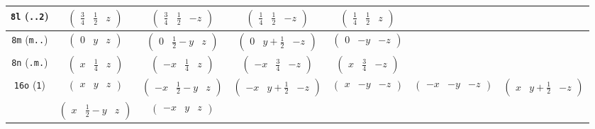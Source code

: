 \documentclass[fleqn,9pt,landscape]{jsarticle}
\begin{document}
\begin{center}
\begin{longtable}{ccccccc}
{\tt 8l} ({\tt ..2}) & $ \begin{pmatrix} \frac{3}{4} & \frac{1}{2} & z \end{pmatrix} $ & $ \begin{pmatrix} \frac{3}{4} & \frac{1}{2} & - z \end{pmatrix} $ & $ \begin{pmatrix} \frac{1}{4} & \frac{1}{2} & - z \end{pmatrix} $ & $ \begin{pmatrix} \frac{1}{4} & \frac{1}{2} & z \end{pmatrix} $ & $  $ & $  $ \\ \hline
{\tt 8m} ({\tt m..}) & $ \begin{pmatrix} 0 & y & z \end{pmatrix} $ & $ \begin{pmatrix} 0 & \frac{1}{2} - y & z \end{pmatrix} $ & $ \begin{pmatrix} 0 & y + \frac{1}{2} & - z \end{pmatrix} $ & $ \begin{pmatrix} 0 & - y & - z \end{pmatrix} $ & $  $ & $  $ \\ \hline
{\tt 8n} ({\tt .m.}) & $ \begin{pmatrix} x & \frac{1}{4} & z \end{pmatrix} $ & $ \begin{pmatrix} - x & \frac{1}{4} & z \end{pmatrix} $ & $ \begin{pmatrix} - x & \frac{3}{4} & - z \end{pmatrix} $ & $ \begin{pmatrix} x & \frac{3}{4} & - z \end{pmatrix} $ & $  $ & $  $ \\ \hline
{\tt 16o} ({\tt 1}) & $ \begin{pmatrix} x & y & z \end{pmatrix} $ & $ \begin{pmatrix} - x & \frac{1}{2} - y & z \end{pmatrix} $ & $ \begin{pmatrix} - x & y + \frac{1}{2} & - z \end{pmatrix} $ & $ \begin{pmatrix} x & - y & - z \end{pmatrix} $ & $ \begin{pmatrix} - x & - y & - z \end{pmatrix} $ & $ \begin{pmatrix} x & y + \frac{1}{2} & - z \end{pmatrix} $ \\
& $ \begin{pmatrix} x & \frac{1}{2} - y & z \end{pmatrix} $ & $ \begin{pmatrix} - x & y & z \end{pmatrix} $ & $  $ & $  $ & $  $ & $  $ \\
\end{longtable}
\end{center}
\end{document}
